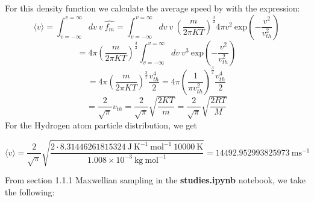 \documentclass[12pt]{article}
\begin{document}
	For this density function we calculate the average speed by with the expression:
	$$ \langle v\rangle = \int_{v = - \infty}^{v = \infty} d v \: v \: \widehat{f_{m}} = \int_{v = - \infty}^{v = \infty} d v \: v \: \left(\frac{m}{2\pi KT}\right)^{\frac{3}{2}} 4 \pi v^{2} \: \mathrm{exp}\left(-\frac{v^{2}}{v_{th}^{2}}\right)$$
	$$=  4 \pi \left(\frac{m}{2\pi KT}\right)^{\frac{3}{2}} \int_{v = - \infty}^{v = \infty} d v \: v^{3} \: \mathrm{exp}\left(-\frac{v^{2}}{v_{th}^{2}}\right)$$ $$ = 4 \pi \left(\frac{m}{2\pi KT}\right)^{\frac{3}{2}} \frac{v_{th}^{4}}{2} = 4 \pi \left(\frac{1}{\pi v_{th}^{2}}\right)^{\frac{3}{2}} \frac{v_{th}^{4}}{2}$$ $$= \frac{2}{\sqrt{\pi}} v_{th} = \frac{2}{\sqrt{\pi}} \sqrt{\frac{2 K T}{m}} = \frac{2}{\sqrt{\pi}} \sqrt{\frac{2 R T}{M}}$$ 
	For the Hydrogen atom particle distribution, we get \begin{tcolorbox}
		$$\langle v\rangle = \frac{2}{\sqrt{\pi}} \sqrt{\frac{2 \cdot 8.31446261815324 \: \mathrm{J} \: \mathrm{K}^{-1} \: \mathrm{mol}^{-1} \: 10000 \: \mathrm{K}}{1.008 \times 10^{-3} \: \mathrm{kg} \: \mathrm{mol}^{-1}}} = 14492.952993825973 \: \mathrm{m}\mathrm{s}^{-1}$$
	\end{tcolorbox}
	
	From section 1.1.1 Maxwellian sampling in the \textbf{studies.ipynb} notebook, we take the following:
	
\end{document}
